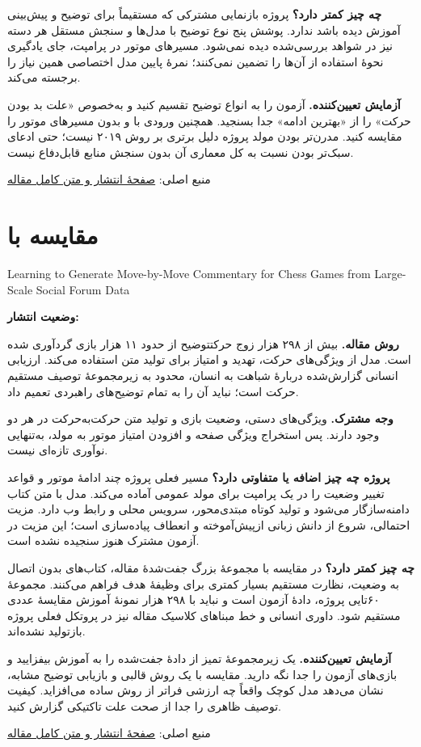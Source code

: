 \documentclass[a4paper,12pt]{article}
\newcommand{\en}[1]{\lr{#1}}
\newcommand{\source}[2]{\par\small منبع اصلی: \href{#1}{#2}\par\normalsize}
\newcommand{\paper}[3]{\clearpage\section{#1}\begin{latin}\small #2\end{latin}\textbf{وضعیت انتشار:} #3\par}
\begin{document}
\textbf{چه چیز کمتر دارد؟} پروژه بازنمایی مشترکی که مستقیماً برای توضیح و پیش‌بینی آموزش دیده باشد ندارد. پوشش پنج نوع توضیح با مدل‌ها و سنجش مستقل هر دسته نیز در شواهد بررسی‌شده دیده نمی‌شود. مسیرهای موتور در پرامپت، جای یادگیری نحوهٔ استفاده از آن‌ها را تضمین نمی‌کنند؛ نمرهٔ پایین مدل اختصاصی همین نیاز را برجسته می‌کند.

\textbf{آزمایش تعیین‌کننده.} آزمون را به انواع توضیح تقسیم کنید و به‌خصوص «علت بد بودن حرکت» را از «بهترین ادامه» جدا بسنجید. همچنین ورودی با و بدون مسیرهای موتور را مقایسه کنید. مدرن‌تر بودن مولد پروژه دلیل برتری بر روش ۲۰۱۹ نیست؛ حتی ادعای سبک‌تر بودن نسبت به کل معماری آن بدون سنجش منابع قابل‌دفاع نیست.
\source{https://aclanthology.org/P19-1597/}{صفحهٔ انتشار و متن کامل مقاله}

\paper{مقایسه با \en{Jhamtani et al.}}{Learning to Generate Move-by-Move Commentary for Chess Games from Large-Scale Social Forum Data}{\en{ACL 2018}}
\textbf{روش مقاله.} بیش از ۲۹۸ هزار زوج حرکتتوضیح از حدود ۱۱ هزار بازی گردآوری شده است. مدل از ویژگی‌های حرکت، تهدید و امتیاز برای تولید متن استفاده می‌کند. ارزیابی انسانی گزارش‌شده دربارهٔ شباهت به انسان، محدود به زیرمجموعهٔ توصیف مستقیم حرکت است؛ نباید آن را به تمام توضیح‌های راهبردی تعمیم داد.

\textbf{وجه مشترک.} ویژگی‌های دستی، وضعیت بازی و تولید متن حرکت‌به‌حرکت در هر دو وجود دارند. پس استخراج ویژگی صفحه و افزودن امتیاز موتور به مولد، به‌تنهایی نوآوری تازه‌ای نیست.

\textbf{پروژه چه چیز اضافه یا متفاوتی دارد؟} مسیر فعلی پروژه چند ادامهٔ موتور و قواعد تغییر وضعیت را در یک پرامپت برای مولد عمومی آماده می‌کند. مدل با متن کتاب دامنه‌سازگار می‌شود و تولید کوتاه مبتدی‌محور، سرویس محلی و رابط وب دارد. مزیت احتمالی، شروع از دانش زبانی ازپیش‌آموخته و انعطاف پیاده‌سازی است؛ این مزیت در آزمون مشترک هنوز سنجیده نشده است.

\textbf{چه چیز کمتر دارد؟} در مقایسه با مجموعهٔ بزرگ جفت‌شدهٔ مقاله، کتاب‌های بدون اتصال به وضعیت، نظارت مستقیم بسیار کمتری برای وظیفهٔ هدف فراهم می‌کنند. مجموعهٔ ۶۰تایی پروژه، دادهٔ آزمون است و نباید با ۲۹۸ هزار نمونهٔ آموزش مقایسهٔ عددی مستقیم شود. داوری انسانی و خط مبناهای کلاسیک مقاله نیز در پروتکل فعلی پروژه بازتولید نشده‌اند.

\textbf{آزمایش تعیین‌کننده.} یک زیرمجموعهٔ تمیز از دادهٔ جفت‌شده را به آموزش بیفزایید و بازی‌های آزمون را جدا نگه دارید. مقایسه با یک روش قالبی و بازیابی توضیح مشابه، نشان می‌دهد مدل کوچک واقعاً چه ارزشی فراتر از روش ساده می‌افزاید. کیفیت توصیف ظاهری را جدا از صحت علت تاکتیکی گزارش کنید.
\source{https://aclanthology.org/P18-1154/}{صفحهٔ انتشار و متن کامل مقاله}
\end{document}
